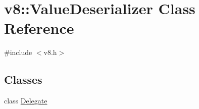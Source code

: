 \hypertarget{classv8_1_1ValueDeserializer}{}\section{v8\+:\+:Value\+Deserializer Class Reference}
\label{classv8_1_1ValueDeserializer}


{\ttfamily \#include $<$v8.\+h$>$}

\subsection*{Classes}
\begin{DoxyCompactItemize}
\item 
class \mbox{\hyperlink{classv8_1_1ValueDeserializer_1_1Delegate}{Delegate}}
\end{DoxyCompactItemize}
